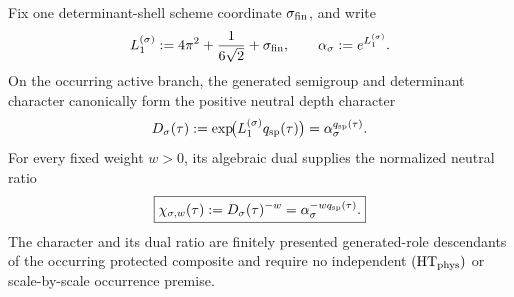 \documentclass[12pt,a4paper]{article}
\begin{document}
\begin{theorem}
\label{p3c:thm:generated-dual-depth-hierarchy}
Fix one determinant-shell scheme coordinate \(\sigma_{\rm fin}\), and write
\[
 L_1^{(\sigma)}
 :=4\pi^2+\frac1{6\sqrt2}+\sigma_{\rm fin},
 \qquad
 \alpha_\sigma:=e^{L_1^{(\sigma)}}.
\]
On the occurring active branch, the generated semigroup and determinant
character canonically form the positive neutral depth character
\begin{equation}
\label{p3c:eq:clocked-depth-character}
 D_\sigma(\tau)
 :=\exp\!\bigl(L_1^{(\sigma)}q_{\rm sp}(\tau)\bigr)
 =\alpha_\sigma^{q_{\rm sp}(\tau)}.
\end{equation}
For every fixed weight \(w>0\), its algebraic dual supplies the normalized
neutral ratio
\begin{equation}
\label{p3c:eq:generated-dual-scale-law}
 \boxed{
 \chi_{\sigma,w}(\tau)
 :=D_\sigma(\tau)^{-w}
 =\alpha_\sigma^{-wq_{\rm sp}(\tau)}.}
\end{equation}
The character and its dual ratio are finitely presented generated-role
descendants of the occurring protected composite and require no independent
\((\mathrm{HT}_{\rm phys})\) or scale-by-scale occurrence premise.


\end{theorem}
\end{document}
